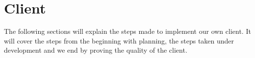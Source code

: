 \section{Client}
The following sections will explain the steps made to implement our own client. It will cover the steps from the beginning with planning, the steps taken under development and we end by proving the quality of the client.




